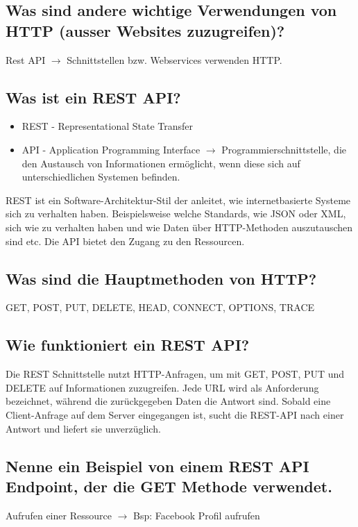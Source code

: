 \subsection*{Was sind andere wichtige Verwendungen von HTTP (ausser Websites zuzugreifen)?}
Rest API $\rightarrow$ Schnittstellen bzw. Webservices verwenden HTTP.

\subsection*{Was ist ein REST API?}
\begin{itemize}
    \item REST - Representational State Transfer
    \item API - Application Programming Interface $\rightarrow$ Programmierschnittstelle, die den Austausch von Informationen ermöglicht, wenn diese sich auf unterschiedlichen Systemen befinden.
\end{itemize}
REST ist ein Software-Architektur-Stil der anleitet, wie internetbasierte Systeme sich zu verhalten haben. Beispielsweise welche Standards, wie JSON oder XML, sich wie zu verhalten haben und wie Daten über HTTP-Methoden auszutauschen sind etc. Die API bietet den Zugang zu den Ressourcen.

\subsection*{Was sind die Hauptmethoden von HTTP?}
GET, POST, PUT, DELETE, HEAD, CONNECT, OPTIONS, TRACE

\subsection*{Wie funktioniert ein REST API?}
Die REST Schnittstelle nutzt HTTP-Anfragen, um mit GET, POST, PUT und DELETE auf Informationen zuzugreifen. Jede URL wird als Anforderung bezeichnet, während die zurückgegeben Daten die Antwort sind. Sobald eine Client-Anfrage auf dem Server eingegangen ist, sucht die REST-API nach einer Antwort und liefert sie unverzüglich.

\subsection*{Nenne ein Beispiel von einem REST API Endpoint, der die GET Methode verwendet.}
Aufrufen einer Ressource $\rightarrow$ Bsp: Facebook Profil aufrufen

